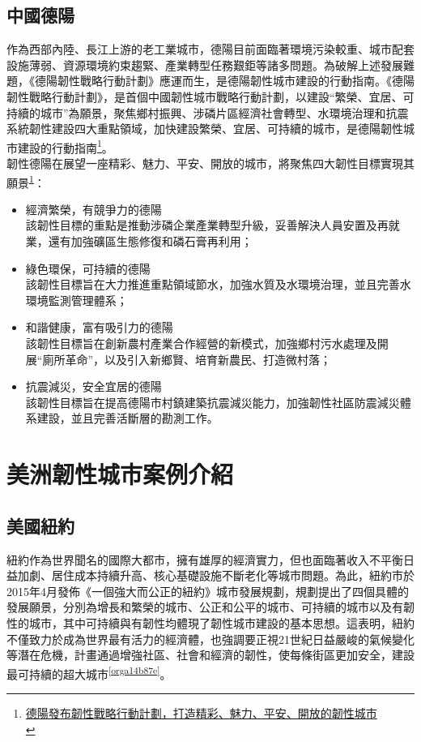 \documentclass[a4paper,12pt]{article}
\begin{document}
\subsection{中國德陽}
\label{sec:orgbe7452e}
作為西部內陸、長江上游的老工業城市，德陽目前面臨著環境污染較重、城市配套設施薄弱、資源環境約束趨緊、產業轉型任務艱鉅等諸多問題。為破解上述發展難題，《德陽韌性戰略行動計劃》應運而生，是德陽韌性城市建設的行動指南。《德陽韌性戰略行動計劃》，是首個中國韌性城市戰略行動計劃，以建設``繁榮、宜居、可持續的城市''為願景，聚焦鄉村振興、涉磷片區經濟社會轉型、水環境治理和抗震系統韌性建設四大重點領域，加快建設繁榮、宜居、可持續的城市，是德陽韌性城市建設的行動指南\footnote{\href{https://www.media-outreach.com/View/8776/}{德陽發布韌性戰略行動計劃，打造精彩、魅力、平安、開放的韌性城市}\\\label{org565ff39}}。\\

韌性德陽在展望一座精彩、魅力、平安、開放的城市，將聚焦四大韌性目標實現其願景\textsuperscript{\ref{org565ff39}}：\\
\begin{itemize}
\item 經濟繁榮，有競爭力的德陽\\
該韌性目標的重點是推動涉磷企業產業轉型升級，妥善解決人員安置及再就業，還有加強礦區生態修復和磷石膏再利用；\\
\item 綠色環保，可持續的德陽\\
該韌性目標旨在大力推進重點領域節水，加強水質及水環境治理，並且完善水環境監測管理體系；\\
\item 和諧健康，富有吸引力的德陽\\
該韌性目標旨在創新農村產業合作經營的新模式，加強鄉村污水處理及開展``廁所革命''，以及引入新鄉賢、培育新農民、打造微村落；\\
\item 抗震減災，安全宜居的德陽\\
該韌性目標旨在提高德陽市村鎮建築抗震減災能力，加強韌性社區防震減災體系建設，並且完善活斷層的勘測工作。\\
\end{itemize}
\newpage

\section{美洲韌性城市案例介紹}
\label{sec:orge74e626}
\subsection{美國紐約}
\label{sec:orga3041f5}
紐約作為世界聞名的國際大都市，擁有雄厚的經濟實力，但也面臨著收入不平衡日益加劇、居住成本持續升高、核心基礎設施不斷老化等城市問題。為此，紐約市於2015年4月發佈《一個強大而公正的紐約》城市發展規劃，規劃提出了四個具體的發展願景，分別為增長和繁榮的城市、公正和公平的城市、可持續的城市以及有韌性的城市，其中可持續與有韌性均體現了韌性城市建設的基本思想。這表明，紐約不僅致力於成為世界最有活力的經濟體，也強調要正視21世紀日益嚴峻的氣候變化等潛在危機，計畫通過增強社區、社會和經濟的韌性，使每條街區更加安全，建設最可持續的超大城市\textsuperscript{\ref{orga14b87e}}。\\
\end{document}
